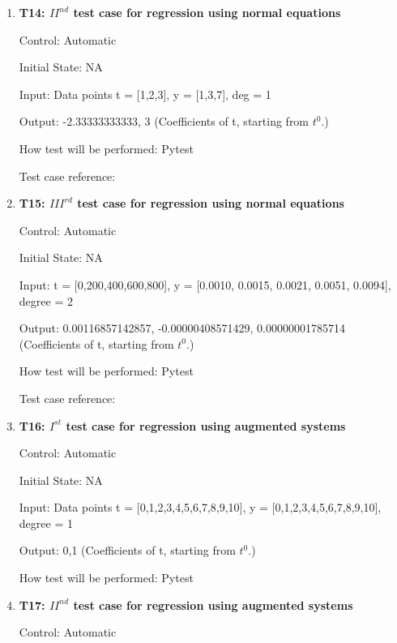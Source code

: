 \documentclass[12pt, titlepage]{article}
\begin{document}
\begin{enumerate}
\item{\textbf{T14: ${II}^{nd}$ test case for regression using normal equations}\\}

Control: Automatic

Initial State: NA

Input: Data points t = [1,2,3], y = [1,3,7], deg = 1

Output: -2.33333333333, 3 (Coefficients of t, starting from $t^{0}$.)

How test will be performed: Pytest

Test case reference: ~\cite{RegNormal}\\


\item{\textbf{T15: ${III}^{rd}$ test case for regression using normal equations }\\}

Control: Automatic

Initial State: NA

Input: t = [0,200,400,600,800], y = [0.0010, 0.0015, 0.0021, 0.0051, 0.0094], degree = 2

Output: 0.00116857142857, -0.00000408571429, 0.00000001785714 (Coefficients of t, starting from $t^{0}$.)

How test will be performed: Pytest

Test case reference:~\cite{RegNormal}\\



\item{\textbf{T16: $I^{st}$ test case for regression using augmented systems}\\}

Control: Automatic

Initial State: NA

Input: Data points t = [0,1,2,3,4,5,6,7,8,9,10], y = [0,1,2,3,4,5,6,7,8,9,10], degree = 1 

Output: 0,1 (Coefficients of t, starting from $t^{0}$.)

How test will be performed: Pytest\\

\item{\textbf{T17: ${II}^{nd}$ test case for regression using augmented systems}\\}

Control: Automatic


\end{enumerate}
\end{document}
